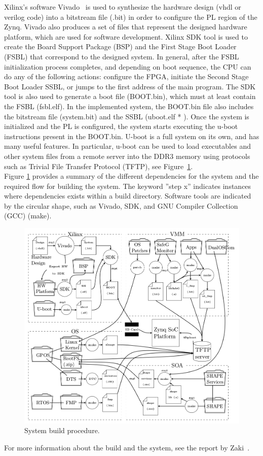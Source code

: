 Xilinx's software Vivado~\cite{website:vivado} is used to synthesize the hardware design (vhdl or verilog code) into a bitstream file (.bit) in order to configure the PL region of the Zynq. Vivado also produces a set of files that represent the designed hardware platform, which are used for software development. Xilinx SDK tool is used to create the Board Support Package (BSP) and the First Stage Boot Loader (FSBL) that correspond to the designed system. In general, after the FSBL initialization process completes, and depending on boot sequence, the CPU can do any of the following actions: configure the FPGA, initiate the Second Stage Boot Loader SSBL, or jumps to the first address of the main program. The SDK tool is also used to generate a boot file (BOOT.bin), which must at least contain the FSBL (fsbl.elf). In the implemented system, the BOOT.bin file also includes the bitstream file (system.bit) and the SSBL (uboot.elf * ). Once the system is initialized and the PL is configured, the system starts executing the u-boot instructions present in the BOOT.bin. U-boot is a full system on its own, and has many useful features. In particular, u-boot can be used to load executables and other system files from a remote server into the DDR3 memory using protocols such as Trivial File Transfer Protocol (TFTP), see Figure~\ref{fig:system_build}.\\

Figure \ref{fig:system_build} provides a summary of the different dependencies for the system and the required flow for building the system. The keyword ”step x” indicates instances where dependencies exists within a build directory. Software tools are indicated by the circular shape, such as Vivado, SDK, and GNU Compiler Collection (GCC) (make).

\begin{figure}[H]
\centering
\includegraphics[width=\textwidth]{./img/literature_build.png}
\caption{System build procedure.\cite{zaki2016}}\label{fig:system_build}
\end{figure}

For more information about the build and the system, see the report by Zaki~\cite{zaki2016}.